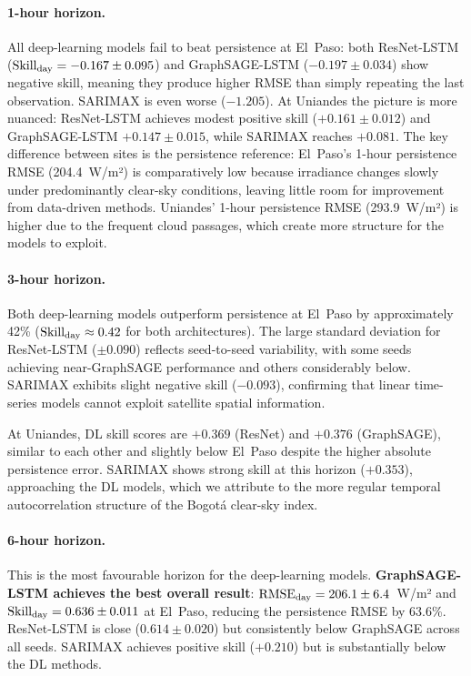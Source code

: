 \paragraph{1-hour horizon.}
All deep-learning models fail to beat persistence at El~Paso: both ResNet-LSTM
($\text{Skill}_\text{day} = -0.167 \pm 0.095$) and GraphSAGE-LSTM ($-0.197 \pm 0.034$) show
negative skill, meaning they produce higher RMSE than simply repeating the last
observation. SARIMAX is even worse ($-1.205$). At Uniandes the picture is more
nuanced: ResNet-LSTM achieves modest positive skill ($+0.161 \pm 0.012$) and
GraphSAGE-LSTM $+0.147 \pm 0.015$, while SARIMAX reaches $+0.081$. The key
difference between sites is the persistence reference: El~Paso's 1-hour persistence
RMSE (204.4~W/m²) is comparatively low because irradiance changes slowly under
predominantly clear-sky conditions, leaving little room for improvement from data-driven
methods. Uniandes' 1-hour persistence RMSE (293.9~W/m²) is higher due to the
frequent cloud passages, which create more structure for the models to exploit.

\paragraph{3-hour horizon.}
Both deep-learning models outperform persistence at El~Paso by approximately
42\% ($\text{Skill}_\text{day} \approx 0.42$ for both architectures). The large standard deviation
for ResNet-LSTM ($\pm 0.090$) reflects seed-to-seed variability, with some seeds
achieving near-GraphSAGE performance and others considerably below. SARIMAX
exhibits slight negative skill ($-0.093$), confirming that linear time-series
models cannot exploit satellite spatial information.

At Uniandes, DL skill scores are $+0.369$ (ResNet) and $+0.376$ (GraphSAGE),
similar to each other and slightly below El~Paso despite the higher absolute
persistence error. SARIMAX shows strong skill at this horizon ($+0.353$),
approaching the DL models, which we attribute to the more regular temporal
autocorrelation structure of the Bogot{\'a} clear-sky index.

\paragraph{6-hour horizon.}
This is the most favourable horizon for the deep-learning models.
\textbf{GraphSAGE-LSTM achieves the best overall result}: $\text{RMSE}_\text{day} = 206.1 \pm 6.4$~W/m²
and $\text{Skill}_\text{day} = 0.636 \pm 0.011$ at El~Paso, reducing the persistence RMSE by
63.6\%. ResNet-LSTM is close ($0.614 \pm 0.020$) but consistently below GraphSAGE
across all seeds. SARIMAX achieves positive skill ($+0.210$) but is substantially
below the DL methods.

